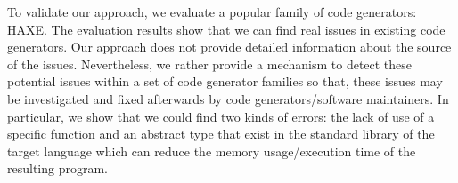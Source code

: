 To validate our approach, we evaluate a popular family of code generators: HAXE. 
The evaluation results show that we can find real issues in existing code generators. 
Our approach does not provide detailed information about the source of the issues. Nevertheless, we rather provide a mechanism to detect these potential issues within a set of code generator families so that, these issues may be investigated and fixed afterwards by code generators/software maintainers. 
In particular, we show that we could find two kinds of errors: the lack of use of a specific function and an abstract type that exist in the standard library of the target language which can reduce the memory usage/execution time of the resulting program.









